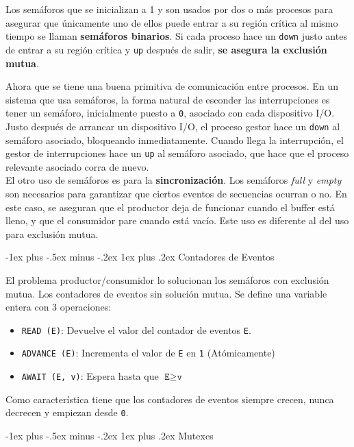 \documentclass[10pt,portrait, twocolumn]{article}
\makeatletter
\renewcommand{\subsubsection}{\@startsection{subsubsection}{3}{0mm}%
                                {-1ex plus -.5ex minus -.2ex}%
                                {1ex plus .2ex}%
                                {\normalfont\small\bfseries}}
\makeatother
\begin{document}
Los semáforos que se inicializan a 1 y son usados por dos o más procesos para asegurar que únicamente uno de ellos puede entrar a su región crítica al mismo tiempo se llaman \textbf{semáforos binarios}. Si cada proceso hace un \texttt{down} justo antes de entrar a su región crítica y \texttt{up} después de salir, \textbf{se asegura la exclusión mutua}.

	\quad Ahora que se tiene una buena primitiva de comunicación entre procesos. En un sistema que usa semáforos, la forma natural  de esconder las interrupciones es tener un semáforo, inicialmente puesto a \texttt{0}, asociado con cada dispositivo I/O. Justo después de arrancar un dispositivo I/O, el proceso gestor hace un \texttt{down} al semáforo asociado, bloqueando inmediatamente. Cuando llega la interrupción, el gestor de interrupciones hace un \texttt{up} al semáforo asociado, que hace que el proceso relevante asociado corra de nuevo.\\
	
El otro uso de semáforos es para la \textbf{sincronización}. Los semáforos \textit{full} y \textit{empty} son necesarios para garantizar que ciertos eventos de secuencias ocurran o no. En este caso, se aseguran que el productor deja de funcionar cuando el buffer está lleno, y que el consumidor pare cuando está vacío. Este uso es diferente al del uso para exclusión mutua.

\subsubsection{Contadores de Eventos}

El problema productor/consumidor lo solucionan los semáforos con exclusión mutua. Los contadores de eventos sin solución mutua. Se define una variable entera con 3 operaciones:

	\begin{itemize}
	\item \texttt{READ (E)}: Devuelve el valor del contador de eventos \texttt{E}.
	\item \texttt{ADVANCE (E)}: Incrementa el valor de \texttt{E} en \texttt{1} (Atómicamente)
	\item \texttt{AWAIT (E, v)}: Espera hasta que $\texttt{E} \geq \texttt{v}$
	\end{itemize}
	
Como característica tiene que los contadores de eventos siempre crecen, nunca decrecen y empiezan desde \texttt{0}.

\subsubsection{Mutexes}
\end{document}
